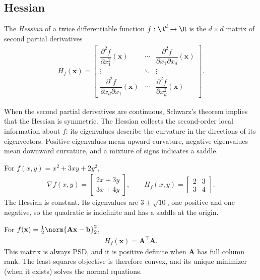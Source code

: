 \documentclass[a4paper, 12pt]{book}
\begin{document}
\subsection{Hessian}

\begin{definition}
    The \emph{Hessian} of a twice differentiable function
    $f : \R^d \to \R$ is the $d \times d$ matrix of second partial derivatives
    \begin{align}
        H_f(\mathbf{x}) =
        \begin{bmatrix}
            \dfrac{\partial^2 f}{\partial x_1^2}(\mathbf{x}) &
            \cdots &
            \dfrac{\partial^2 f}{\partial x_1\partial x_d}(\mathbf{x})\\
            \vdots & \ddots & \vdots\\
            \dfrac{\partial^2 f}{\partial x_d\partial x_1}(\mathbf{x}) &
            \cdots &
            \dfrac{\partial^2 f}{\partial x_d^2}(\mathbf{x})
        \end{bmatrix}.
    \end{align}
\end{definition}
When the second partial derivatives are continuous, Schwarz's theorem implies that
the Hessian is symmetric. The Hessian collects the second-order local information
about $f$: its eigenvalues describe the curvature in the directions of its
eigenvectors. Positive eigenvalues mean upward curvature, negative eigenvalues mean
downward curvature, and a mixture of signs indicates a saddle.

\begin{example}
    For $f(x,y)=x^2+3xy+2y^2$,
    \begin{align}
        \nabla f(x,y) = \begin{bmatrix}2x+3y\\3x+4y\end{bmatrix},
        \qquad
        H_f(x,y) = \begin{bmatrix}2&3\\3&4\end{bmatrix}.
    \end{align}
    The Hessian is constant. Its eigenvalues are $3\pm\sqrt{10}$, one positive and
    one negative, so the quadratic is indefinite and has a saddle at the origin.
\end{example}

\begin{example}
    For $f(\mathbf{x})=\frac12\norm{\mathbf{A}\mathbf{x}-\mathbf{b}}_2^2$,
    \begin{align}
        H_f(\mathbf{x}) = \mathbf{A}^\top\mathbf{A}.
    \end{align}
    This matrix is always PSD, and it is positive definite when $\mathbf{A}$ has full
    column rank. The least-squares objective is therefore convex, and its unique
    minimizer (when it exists) solves the normal equations.
\end{example}
\end{document}
